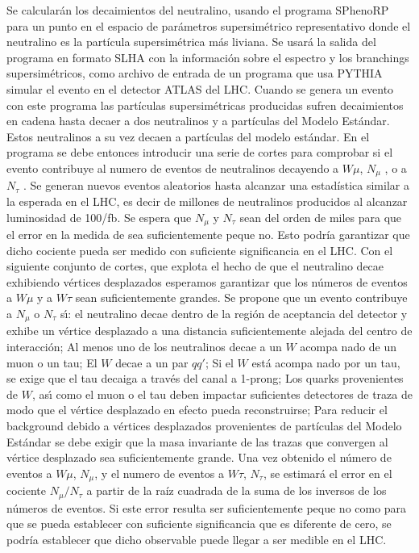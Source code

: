 Se calcularán los decaimientos del neutralino, usando el programa
SPhenoRP para un punto en el espacio de parámetros supersimétrico
representativo %
donde el neutralino es
la partícula supersimétrica más liviana. Se usará la salida del
programa en formato SLHA %
con la información
sobre el espectro y los branchings supersimétricos, como archivo de
entrada de un programa que usa PYTHIA %
simular el evento en el detector ATLAS del LHC. Cuando se genera un
evento con este programa las partículas supersimétricas producidas
sufren decaimientos en cadena hasta decaer a dos neutralinos y a
partículas del Modelo Estándar. Estos neutralinos a su vez decaen a
partículas del modelo estándar. En el programa se debe entonces
introducir una serie de cortes para comprobar si el evento contribuye
al numero de eventos de neutralinos decayendo a $W\mu$, $N_\mu$ , o a
$N_\tau$ . Se generan nuevos eventos aleatorios hasta alcanzar una
estadística similar a la esperada en el LHC, es decir de millones de
neutralinos producidos al alcanzar luminosidad de 100/fb. Se espera
que $N_\mu$ y $N_\tau$ sean del orden de miles para que el error en la
medida de sea suficientemente peque no. Esto podría garantizar que
dicho cociente pueda ser medido con suficiente significancia en el
LHC. Con el siguiente conjunto de cortes, que explota el hecho de que
el neutralino decae exhibiendo vértices desplazados
esperamos garantizar que los números de eventos
a $W\mu$ y a $W\tau$ sean suficientemente grandes. Se propone que un evento
contribuye a $N_\mu$ o $N_\tau$ s\'\i: el neutralino decae dentro de la región
de aceptancia del detector y exhibe un vértice desplazado a una
distancia suficientemente alejada del centro de interacción; Al menos
uno de los neutralinos decae a un $W$ acompa nado de un muon o un tau;
El $W$ decae a un par $qq'$; Si el $W$ está acompa nado por un tau, se
exige que el tau decaiga a través del canal a 1-prong; Los quarks
provenientes de $W$, as\'\i{} como el muon o el tau deben impactar
suficientes detectores de traza de modo que el vértice desplazado en
efecto pueda reconstruirse; Para reducir el background debido a
vértices desplazados provenientes de partículas del Modelo Estándar se
debe exigir que la masa invariante de las trazas que convergen al
vértice desplazado sea suficientemente grande.  Una vez obtenido el
número de eventos a $W \mu$, $N_\mu$, y el numero de eventos a $W \tau$, $N_\tau$, se
estimará el error en el cociente $N_\mu / N_\tau$ a partir de la raíz
cuadrada de la suma de los inversos de los números de eventos. Si este
error resulta ser suficientemente peque no como para que se pueda
establecer con suficiente significancia que es diferente de cero, se
podría establecer que dicho observable puede llegar a ser medible en
el LHC.

